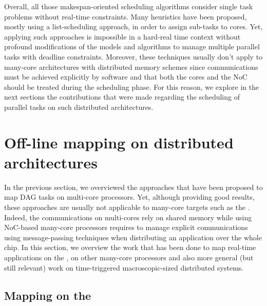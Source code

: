 \documentclass[main.tex]{subfiles}
\begin{document}
Overall, all those makespan-oriented scheduling algorithms consider single task
problems without real-time constraints. Many heuristics have been proposed,
mostly using a list-scheduling approach, in order to assign sub-tasks to cores.
Yet, applying such approaches is impossible in a hard-real time context without
profound modifications of the models and algorithms to manage multiple parallel
tasks with deadline constraints. Moreover, these techniques usually don't apply
to many-core architectures with distributed memory schemes since communications
must be achieved explicitly by software and that both the cores and the NoC
should be treated during the scheduling phase. For this reason, we explore in
the next sections the contributions that were made regarding the scheduling of
parallel tasks on such distributed architectures.



\section{Off-line mapping on distributed architectures}

In the previous section, we overviewed the approaches that have been proposed
to map DAG tasks on multi-core processors. Yet, although providing good
results, these approaches are usually not applicable to many-core targets such
as the \mppalong.  Indeed, the communications on multi-cores rely on shared
memory while using NoC-based many-core processors requires to manage explicit
communications using message-passing techniques when distributing an
application over the whole chip. In this section, we overview the work that has
been done to map real-time applications on the \mppalong, on other many-core
processors and also more general (but still relevant) work on time-triggered
macroscopic-sized distributed systems. 

\subsection{Mapping on the \mppalong}
\end{document}
